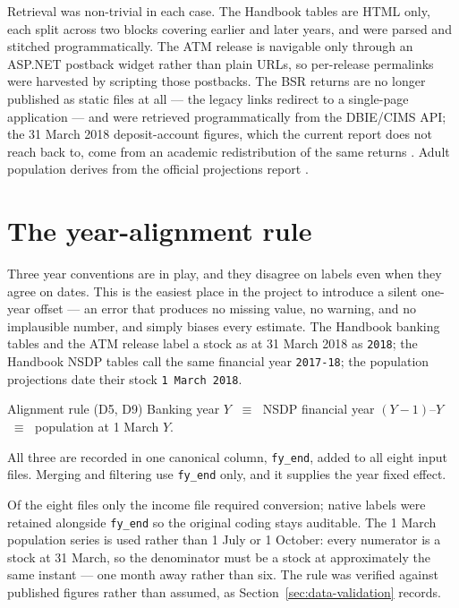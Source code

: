 \noindent
Retrieval was non-trivial in each case. The Handbook tables \citep{rbi_handbook} are HTML only,
each split across two blocks covering earlier and later years, and were parsed and stitched
programmatically. The ATM release \citep{rbi_atm} is navigable only through an ASP.NET postback
widget rather than plain URLs, so per-release permalinks were harvested by scripting those
postbacks. The BSR returns \citep{rbi_bsr} are no longer published as static files at all --- the
legacy links redirect to a single-page application --- and were retrieved programmatically from the
DBIE/CIMS API; the 31 March 2018 deposit-account figures, which the current report does not reach
back to, come from an academic redistribution of the same returns \citep{idp}. Adult population
derives from the official projections report \citep{popproj2020}.

\section{The year-alignment rule}
\label{sec:data-years}

Three year conventions are in play, and they disagree on labels even when they agree on dates. This
is the easiest place in the project to introduce a silent one-year offset --- an error that
produces no missing value, no warning, and no implausible number, and simply biases every estimate.
The Handbook banking tables and the ATM release label a stock as at 31 March 2018 as
\texttt{2018}; the Handbook NSDP tables call the same financial year \texttt{2017-18}; the
population projections date their stock \texttt{1 March 2018}.

\begin{keybox}{Alignment rule (D5, D9)}
Banking year $Y$ $\;\equiv\;$ NSDP financial year $(Y-1)$--$Y$ $\;\equiv\;$ population at
1 March $Y$.

\medskip
All three are recorded in one canonical column, \texttt{fy\_end}, added to all eight input files.
Merging and filtering use \texttt{fy\_end} only, and it supplies the year fixed effect.
\end{keybox}

\noindent
Of the eight files only the income file required conversion; native labels were retained alongside
\texttt{fy\_end} so the original coding stays auditable. The 1 March population series is used
rather than 1 July or 1 October: every numerator is a stock at 31 March, so the denominator must be
a stock at approximately the same instant --- one month away rather than six. The rule was verified
against published figures rather than assumed, as Section~\ref{sec:data-validation} records.

